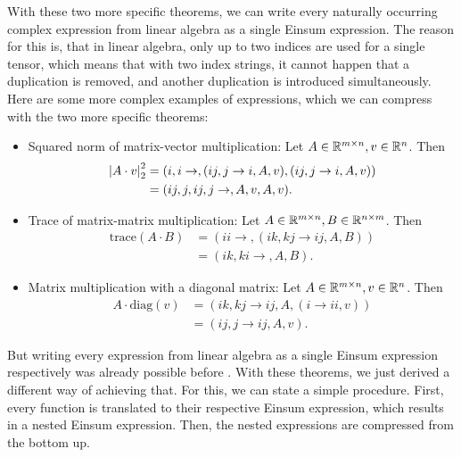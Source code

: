 With these two more specific theorems, we can write every naturally occurring complex expression from linear algebra as a single Einsum expression.
The reason for this is, that in linear algebra, only up to two indices are used for a single tensor,
which means that with two index strings, it cannot happen that a duplication is removed, and another duplication is introduced simultaneously.
Here are some more complex examples of expressions, which we can compress with the two more specific theorems:
\begin{itemize}
    \item Squared norm of matrix-vector multiplication: Let $A \in \mathbb{R}^{m \times n}, v \in \mathbb{R}^{n}$. Then
          \begin{align*}
              \left\lvert A \cdot v \right\rvert_2^2 & = (i,i\rightarrow,(ij, j \rightarrow i, A, v),(ij, j \rightarrow i, A, v)) \\
                                  & = (ij,j,ij,j\rightarrow,A,v,A,v).
          \end{align*}
    \item Trace of matrix-matrix multiplication: Let $A \in \mathbb{R}^{m \times n}, B \in \mathbb{R}^{n \times m}$. Then
          \begin{align*}
              \text{trace}(A \cdot B) & = (ii \rightarrow, (ik, kj \rightarrow ij, A, B)) \\
                                      & = (ik, ki \rightarrow, A, B).
          \end{align*}
    \item Matrix multiplication with a diagonal matrix: Let $A \in \mathbb{R}^{m \times n}, v \in \mathbb{R}^{n}$. Then
          \begin{align*}
              A \cdot \text{diag}(v) & = (ik, kj \rightarrow ij, A, (i \rightarrow ii, v)) \\
                                     & = (ij, j \rightarrow ij, A, v).
          \end{align*}
\end{itemize}

But writing every expression from linear algebra as a single Einsum expression respectively was already possible before \cite{Klaus2023}.
With these theorems, we just derived a different way of achieving that.
For this, we can state a simple procedure.
First, every function is translated to their respective Einsum expression, which results in a nested Einsum expression.
Then, the nested expressions are compressed from the bottom up.


